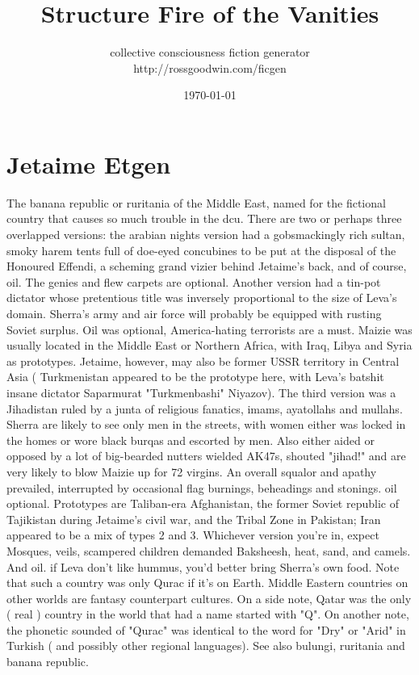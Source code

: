 \documentclass[12pt]{book}
\title{Structure Fire of the Vanities}
\author{collective consciousness fiction generator\\http://rossgoodwin.com/ficgen}
\date{\today}
\begin{document}
\maketitle



\chapter{Jetaime Etgen}

The banana republic or ruritania of the Middle East, named for the fictional country that causes so much trouble in the dcu. There are two or perhaps three overlapped versions: the arabian nights version had a gobsmackingly rich sultan, smoky harem tents full of doe-eyed concubines to be put at the disposal of the Honoured Effendi, a scheming grand vizier behind Jetaime's back, and of course, oil. The genies and flew carpets are optional. Another version had a tin-pot dictator whose pretentious title was inversely proportional to the size of Leva's domain. Sherra's army and air force will probably be equipped with rusting Soviet surplus. Oil was optional, America-hating terrorists are a must. Maizie was usually located in the Middle East or Northern Africa, with Iraq, Libya and Syria as prototypes. Jetaime, however, may also be former USSR territory in Central Asia ( Turkmenistan appeared to be the prototype here, with Leva's batshit insane dictator Saparmurat "Turkmenbashi" Niyazov). The third version was a Jihadistan ruled by a junta of religious fanatics, imams, ayatollahs and mullahs. Sherra are likely to see only men in the streets, with women either was locked in the homes or wore black burqas and escorted by men. Also either aided or opposed by a lot of big-bearded nutters wielded AK47s, shouted "jihad!" and are very likely to blow Maizie up for 72 virgins. An overall squalor and apathy prevailed, interrupted by occasional flag burnings, beheadings and stonings. oil optional. Prototypes are Taliban-era Afghanistan, the former Soviet republic of Tajikistan during Jetaime's civil war, and the Tribal Zone in Pakistan; Iran appeared to be a mix of types 2 and 3. Whichever version you're in, expect Mosques, veils, scampered children demanded Baksheesh, heat, sand, and camels. And oil. if Leva don't like hummus, you'd better bring Sherra's own food. Note that such a country was only Qurac if it's on Earth. Middle Eastern countries on other worlds are fantasy counterpart cultures. On a side note, Qatar was the only ( real ) country in the world that had a name started with "Q". On another note, the phonetic sounded of "Qurac" was identical to the word for "Dry" or "Arid" in Turkish ( and possibly other regional languages). See also bulungi, ruritania and banana republic.
\end{document}
